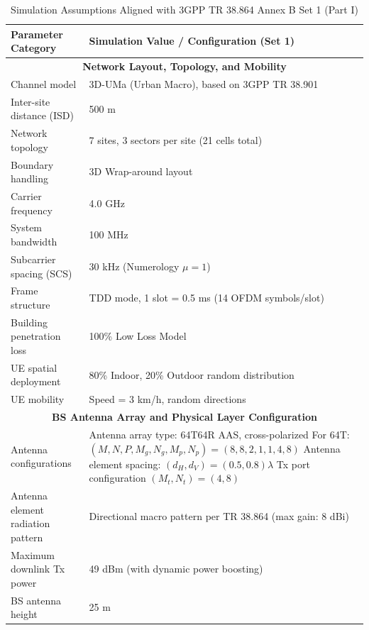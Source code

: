 \begin{table}[htbp]
\centering
\caption{Simulation Assumptions Aligned with 3GPP TR 38.864 Annex B Set 1 (Part I)}
\label{tab:appendix_3gpp_set1_part1}
\renewcommand{\arraystretch}{1.25}
\begin{tabularx}{\textwidth}{|p{}|X|}
\hline
\textbf{Parameter Category} & \textbf{Simulation Value / Configuration (Set 1)} \\ \hline
\multicolumn{2}{|c|}{\textbf{Network Layout, Topology, and Mobility}} \\ \hline
Channel model & 3D-UMa (Urban Macro), based on 3GPP TR 38.901 \\ \hline
Inter-site distance (ISD) & 500 m \\ \hline
Network topology & 7 sites, 3 sectors per site (21 cells total) \\ \hline
Boundary handling & 3D Wrap-around layout \\ \hline
Carrier frequency & 4.0 GHz \\ \hline
System bandwidth & 100 MHz \\ \hline
Subcarrier spacing (SCS) & 30 kHz (Numerology $\mu = 1$) \\ \hline
Frame structure & TDD mode, 1 slot = 0.5 ms (14 OFDM symbols/slot) \\ \hline
Building penetration loss & 100\% Low Loss Model \\ \hline
UE spatial deployment & 80\% Indoor, 20\% Outdoor random distribution \\ \hline
UE mobility & Speed = 3 km/h, random directions \\ \hline
\multicolumn{2}{|c|}{\textbf{BS Antenna Array and Physical Layer Configuration}} \\ \hline
Antenna configurations & 
  Antenna array type: 64T64R AAS, cross-polarized \newline
  For 64T: $(M, N, P, M_g, N_g, M_p, N_p) = (8, 8, 2, 1, 1, 4, 8)$ \newline
  Antenna element spacing: $(d_H, d_V) = (0.5, 0.8)\lambda$ \newline
  Tx port configuration $(M_t, N_t) = (4, 8)$ \\ \hline
Antenna element radiation pattern & Directional macro pattern per TR 38.864 (max gain: 8 dBi) \\ \hline
Maximum downlink Tx power & 49 dBm (with dynamic power boosting) \\ \hline
BS antenna height & 25 m \\ \hline

\end{tabularx}
\end{table}
